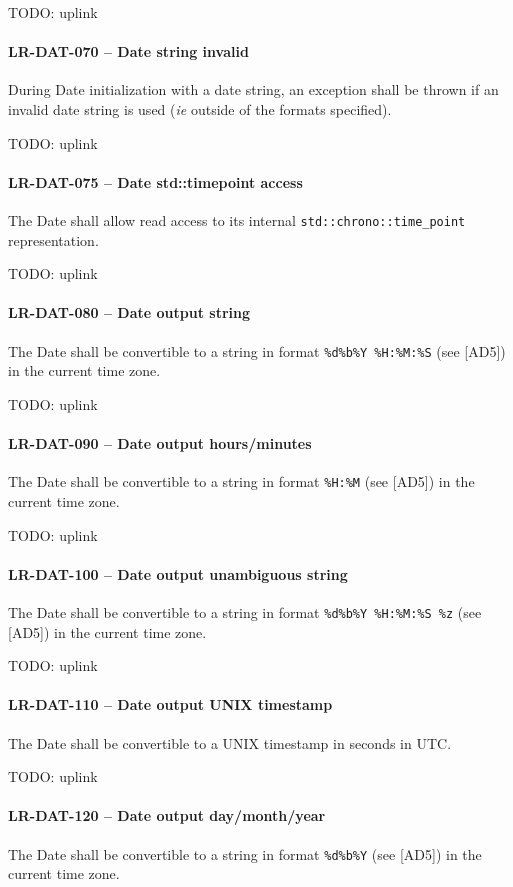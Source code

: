 TODO: uplink

\paragraph{LR-DAT-070 -- Date string invalid}
During Date initialization with a date string, an exception shall be
thrown if an invalid date string is used (\textit{ie} outside of the formats
specified).

TODO: uplink

\paragraph{LR-DAT-075 -- Date std::time\textunderscore point access}
The Date shall allow read access to its internal
\lstinline{std::chrono::time_point} representation.

TODO: uplink

\paragraph{LR-DAT-080 -- Date output string}
The Date shall be convertible to a string in format
\lstinline{%d%b%Y %H:%M:%S} (see [AD5]) in the current time zone.

TODO: uplink
\paragraph{LR-DAT-090 -- Date output hours/minutes}
The Date shall be convertible to a string in format
\lstinline{%H:%M} (see [AD5]) in the current time zone.

TODO: uplink
\paragraph{LR-DAT-100 -- Date output unambiguous string}
The Date shall be convertible to a string in format
\lstinline{%d%b%Y %H:%M:%S %z} (see [AD5]) in the current time zone.

TODO: uplink
\paragraph{LR-DAT-110 -- Date output UNIX timestamp}
The Date shall be convertible to a UNIX timestamp in seconds in \gls{UTC}.

TODO: uplink
\paragraph{LR-DAT-120 -- Date output day/month/year}
The Date shall be convertible to a string in format
\lstinline{%d%b%Y} (see [AD5]) in the current time zone.

